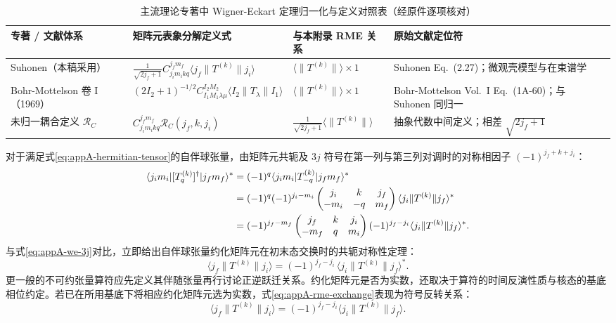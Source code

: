 \begin{table}[htbp]
\centering
\small
\caption{主流理论专著中 Wigner-Eckart 定理归一化与定义对照表（经原件逐项核对）}\label{tab:appA-convention-comparison}
\begin{tabularx}{\textwidth}{p{2.8cm} p{4.4cm} p{2.5cm} >{\raggedright\arraybackslash}X}
\toprule
专著 / 文献体系 & 矩阵元表象分解定义式 & 与本附录 RME 关系 & 原始文献定位符 \\
\midrule
Suhonen（本稿采用） & $\frac{1}{\sqrt{2j_f+1}} C_{j_i m_i k q}^{j_f m_f} \langle j_f \| T^{(k)} \| j_i \rangle$ & $\langle \| T^{(k)} \| \rangle \times 1$ & Suhonen Eq.~(2.27)；微观壳模型与在束谱学 \\
\addlinespace
Bohr-Mottelson 卷 I（1969） & $(2I_2 + 1)^{-1/2} C_{I_1 M_1 \lambda \mu}^{I_2 M_2} \langle I_2 \| T_\lambda \| I_1 \rangle$ & $\langle \| T^{(k)} \| \rangle \times 1$ & Bohr-Mottelson Vol.~I Eq.~(1A-60)；与 Suhonen 同归一 \\
\addlinespace
未归一耦合定义 $\mathcal{R}_C$ & $C_{j_i m_i k q}^{j_f m_f} \mathcal{R}_C(j_f, k, j_i)$ & $\frac{1}{\sqrt{2j_f+1}} \langle \| T^{(k)} \| \rangle$ & 抽象代数中间定义；相差 $\sqrt{2j_f+1}$ \\
\bottomrule
\end{tabularx}
\end{table}

对于满足式\eqref{eq:appA-hermitian-tensor}的自伴球张量，由矩阵元共轭及 $3j$ 符号在第一列与第三列对调时的对称相因子 $(-1)^{j_f + k + j_i}$：
\begin{align}\label{eq:appA-rme-adjoint-deriv}
\langle j_i m_i | [T_q^{(k)}]^\dagger | j_f m_f \rangle^* &= (-1)^q \langle j_i m_i | T_{-q}^{(k)} | j_f m_f \rangle^* \notag \\
&= (-1)^q (-1)^{j_i - m_i} \begin{pmatrix} j_i & k & j_f \\ -m_i & -q & m_f \end{pmatrix} \langle j_i \| T^{(k)} \| j_f \rangle^* \notag \\
&= (-1)^{j_f - m_f} \begin{pmatrix} j_f & k & j_i \\ -m_f & q & m_i \end{pmatrix} (-1)^{j_f - j_i} \langle j_i \| T^{(k)} \| j_f \rangle^* .
\end{align}
与式\eqref{eq:appA-we-3j}对比，立即给出自伴球张量约化矩阵元在初末态交换时的共轭对称性定理：
\begin{equation}\label{eq:appA-rme-exchange}
\langle j_f \| T^{(k)} \| j_i \rangle = (-1)^{j_f - j_i} \, \langle j_i \| T^{(k)} \| j_f \rangle^* .
\end{equation}
更一般的不可约张量算符应先定义其伴随张量再行讨论正逆跃迁关系。约化矩阵元是否为实数，还取决于算符的时间反演性质与核态的基底相位约定。若已在所用基底下将相应约化矩阵元选为实数，式\eqref{eq:appA-rme-exchange}表现为符号反转关系：
\begin{equation}\label{eq:appA-rme-real-exchange}
\langle j_f \| T^{(k)} \| j_i \rangle = (-1)^{j_f - j_i} \langle j_i \| T^{(k)} \| j_f \rangle .
\end{equation}

